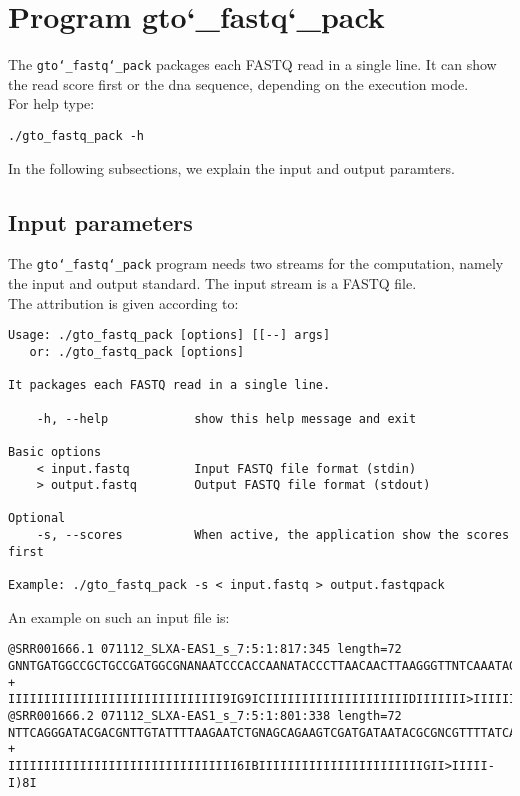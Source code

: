 \section{Program gto\char`_fastq\char`_pack}
The \texttt{gto\char`_fastq\char`_pack} packages each FASTQ read in a single line. It can show the read score first or the dna sequence, depending on the execution mode. \\
For help type:
\begin{lstlisting}
./gto_fastq_pack -h
\end{lstlisting}
In the following subsections, we explain the input and output paramters.

\subsection*{Input parameters}

The \texttt{gto\char`_fastq\char`_pack} program needs two streams for the computation, namely the input and output standard. The input stream is a FASTQ file.\\
The attribution is given according to:
\begin{lstlisting}
Usage: ./gto_fastq_pack [options] [[--] args]
   or: ./gto_fastq_pack [options]

It packages each FASTQ read in a single line.

    -h, --help            show this help message and exit

Basic options
    < input.fastq         Input FASTQ file format (stdin)
    > output.fastq        Output FASTQ file format (stdout)

Optional
    -s, --scores          When active, the application show the scores first

Example: ./gto_fastq_pack -s < input.fastq > output.fastqpack
\end{lstlisting}
An example on such an input file is:
\begin{lstlisting}
@SRR001666.1 071112_SLXA-EAS1_s_7:5:1:817:345 length=72
GNNTGATGGCCGCTGCCGATGGCGNANAATCCCACCAANATACCCTTAACAACTTAAGGGTTNTCAAATAGA
+
IIIIIIIIIIIIIIIIIIIIIIIIIIIIII9IG9ICIIIIIIIIIIIIIIIIIIIIDIIIIIII>IIIIII/
@SRR001666.2 071112_SLXA-EAS1_s_7:5:1:801:338 length=72
NTTCAGGGATACGACGNTTGTATTTTAAGAATCTGNAGCAGAAGTCGATGATAATACGCGNCGTTTTATCAN
+
IIIIIIIIIIIIIIIIIIIIIIIIIIIIIIII6IBIIIIIIIIIIIIIIIIIIIIIIIGII>IIIII-I)8I
\end{lstlisting}

